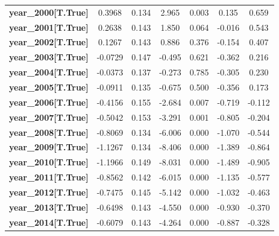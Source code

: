 \begin{center}
\begin{tabular}{lcccccc}
\textbf{year\_2000[T.True]}       &       0.3968  &        0.134     &     2.965  &         0.003        &        0.135    &        0.659     \\
\textbf{year\_2001[T.True]}       &       0.2638  &        0.143     &     1.850  &         0.064        &       -0.016    &        0.543     \\
\textbf{year\_2002[T.True]}       &       0.1267  &        0.143     &     0.886  &         0.376        &       -0.154    &        0.407     \\
\textbf{year\_2003[T.True]}       &      -0.0729  &        0.147     &    -0.495  &         0.621        &       -0.362    &        0.216     \\
\textbf{year\_2004[T.True]}       &      -0.0373  &        0.137     &    -0.273  &         0.785        &       -0.305    &        0.230     \\
\textbf{year\_2005[T.True]}       &      -0.0911  &        0.135     &    -0.675  &         0.500        &       -0.356    &        0.173     \\
\textbf{year\_2006[T.True]}       &      -0.4156  &        0.155     &    -2.684  &         0.007        &       -0.719    &       -0.112     \\
\textbf{year\_2007[T.True]}       &      -0.5042  &        0.153     &    -3.291  &         0.001        &       -0.805    &       -0.204     \\
\textbf{year\_2008[T.True]}       &      -0.8069  &        0.134     &    -6.006  &         0.000        &       -1.070    &       -0.544     \\
\textbf{year\_2009[T.True]}       &      -1.1267  &        0.134     &    -8.406  &         0.000        &       -1.389    &       -0.864     \\
\textbf{year\_2010[T.True]}       &      -1.1966  &        0.149     &    -8.031  &         0.000        &       -1.489    &       -0.905     \\
\textbf{year\_2011[T.True]}       &      -0.8562  &        0.142     &    -6.015  &         0.000        &       -1.135    &       -0.577     \\
\textbf{year\_2012[T.True]}       &      -0.7475  &        0.145     &    -5.142  &         0.000        &       -1.032    &       -0.463     \\
\textbf{year\_2013[T.True]}       &      -0.6498  &        0.143     &    -4.550  &         0.000        &       -0.930    &       -0.370     \\
\textbf{year\_2014[T.True]}       &      -0.6079  &        0.143     &    -4.264  &         0.000        &       -0.887    &       -0.328     \\

\end{tabular}
\end{center}
